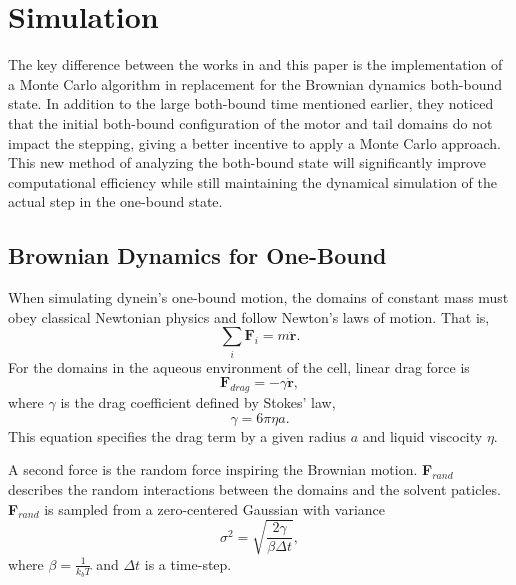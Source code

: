 \section{Simulation}

The key difference between the works in \cite{Capek2017, waczak2019drunken} and this paper is the implementation of a Monte Carlo algorithm in replacement for the Brownian dynamics both-bound state. In addition to the large both-bound time mentioned earlier, they noticed that the initial both-bound configuration of the motor and tail domains do not impact the stepping, giving a better incentive to apply a Monte Carlo approach. This new method of analyzing the both-bound state will significantly improve computational efficiency while still maintaining the dynamical simulation of the actual step in the one-bound state. 



\subsection{Brownian Dynamics for One-Bound}
\label{sec:BrownianDynamics}

When simulating dynein's one-bound motion, the domains of constant mass must obey classical Newtonian physics and follow Newton's laws of motion. That is,
\begin{equation}
	\sum_{i}\textbf{F}_i=m\ddot{\textbf{r}}.
\end{equation} 
For the domains in the aqueous environment of the cell, linear drag force is
\begin{equation}
	\textbf{F}_{drag}=-\gamma \dot{\textbf{r}},
\end{equation}
where $\gamma$ is the drag coefficient defined by Stokes' law,
\begin{equation}
	\gamma=6\pi\eta a.
\end{equation}
This equation specifies the drag term by a given radius $a$ and liquid viscocity $\eta$. 

A second force is the random force inspiring the Brownian motion. \textbf{F}$_{rand}$ describes the random interactions between the domains and the solvent paticles. \textbf{F}$_{rand}$ is sampled from a zero-centered Gaussian with variance
\begin{equation}
	\sigma^2=\sqrt{\frac{2\gamma}{\beta\Delta t}},
\end{equation}
where $\beta=\frac{1}{k_bT}$  and $\Delta t$ is a time-step. 

